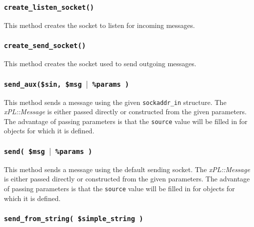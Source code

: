 \documentclass[12pt,a4paper]{article}
\begin{document}
\subsubsection*{\texttt{create\_listen\_socket()}\label{xPL::Listener_create_listen_socket_}}


This method creates the socket to listen for incoming messages.

\subsubsection*{\texttt{create\_send\_socket()}\label{xPL::Listener_create_send_socket_}}


This method creates the socket used to send outgoing messages.

\subsubsection*{\texttt{send\_aux(\$sin, \$msg $|$ \%params )}\label{xPL::Listener_send_aux_sin_msg_params_}}


This method sends a message using the given \texttt{sockaddr\_in} structure.
The \emph{xPL::Message} is either passed directly or constructed from the
given parameters.  The advantage of passing parameters is that the
\texttt{source} value will be filled in for objects for which it is defined.

\subsubsection*{\texttt{send( \$msg $|$ \%params )}\label{xPL::Listener_send_msg_params_}}


This method sends a message using the default sending socket.  The
\emph{xPL::Message} is either passed directly or constructed from the
given parameters.  The advantage of passing parameters is that the
\texttt{source} value will be filled in for objects for which it is defined.

\subsubsection*{\texttt{send\_from\_string( \$simple\_string )}\label{xPL::Listener_send_from_string_simple_string_}}
\end{document}
